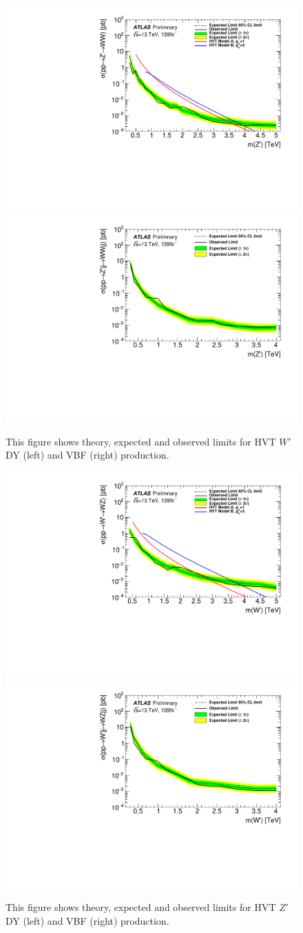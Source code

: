 \begin{figure}[h!]
  \centering
  \includegraphics[width=0.48\hsize]{figures/results/limits/limits_hvtww.pdf}
  \includegraphics[width=0.48\hsize]{figures/results/limits/limits_hvtwwvbf.pdf}

 \caption{This figure shows theory, expected and observed limits for HVT $W'$ DY (left) and VBF (right) production.}
  \label{fig:hvtww_limit}
\end{figure} 
\FloatBarrier


\begin{figure}[h!]
  \centering
  \includegraphics[width=0.48\hsize]{figures/results/limits/limits_hvtwz.pdf}
  \includegraphics[width=0.48\hsize]{figures/results/limits/limits_hvtwzvbf.pdf}

 \caption{This figure shows theory, expected and observed limits for HVT $Z'$ DY (left) and VBF (right) production.}
  \label{fig:hvtwz_limit}
\end{figure} 
\FloatBarrier

